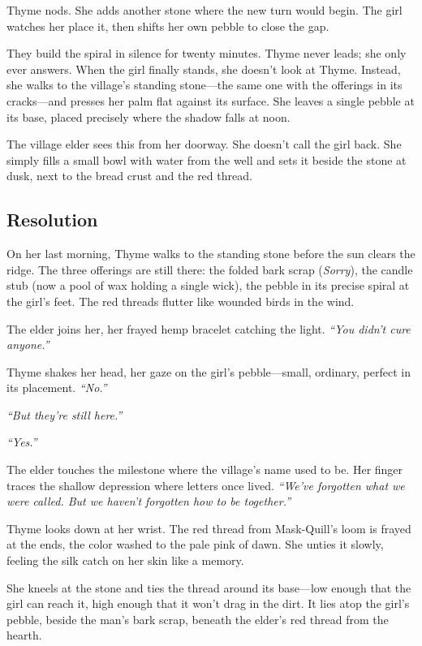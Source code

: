 \documentclass[11pt]{book}
\begin{document}
Thyme nods. She adds another stone where the new turn would begin. The girl watches her place it, then shifts her own pebble to close the gap.

They build the spiral in silence for twenty minutes. Thyme never leads; she only ever answers. When the girl finally stands, she doesn't look at Thyme. Instead, she walks to the village's standing stone---the same one with the offerings in its cracks---and presses her palm flat against its surface. She leaves a single pebble at its base, placed precisely where the shadow falls at noon.

The village elder sees this from her doorway. She doesn't call the girl back. She simply fills a small bowl with water from the well and sets it beside the stone at dusk, next to the bread crust and the red thread.

\subsection*{Resolution}
On her last morning, Thyme walks to the standing stone before the sun clears the ridge. The three offerings are still there: the folded bark scrap (\textit{Sorry}), the candle stub (now a pool of wax holding a single wick), the pebble in its precise spiral at the girl's feet. The red threads flutter like wounded birds in the wind.

The elder joins her, her frayed hemp bracelet catching the light. \textit{``You didn't cure anyone.''}

Thyme shakes her head, her gaze on the girl's pebble---small, ordinary, perfect in its placement. \textit{``No.''}

\textit{``But they're still here.''}

\textit{``Yes.''}

The elder touches the milestone where the village's name used to be. Her finger traces the shallow depression where letters once lived. \textit{``We've forgotten what we were called. But we haven't forgotten how to be together.''}

Thyme looks down at her wrist. The red thread from Mask-Quill's loom is frayed at the ends, the color washed to the pale pink of dawn. She unties it slowly, feeling the silk catch on her skin like a memory.

She kneels at the stone and ties the thread around its base---low enough that the girl can reach it, high enough that it won't drag in the dirt. It lies atop the girl's pebble, beside the man's bark scrap, beneath the elder's red thread from the hearth.
\end{document}
